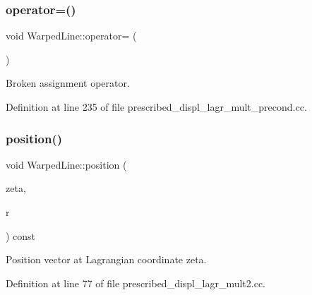 \mbox{\label{classWarpedLine_ae2ee796906c0caa7e94f277f6fc499e1}} 
\subsubsection{\texorpdfstring{operator=()}{operator=()}\hspace{0.1cm}{\footnotesize\ttfamily [3/3]}}
{\footnotesize\ttfamily void Warped\+Line\+::operator= (\begin{DoxyParamCaption}\item[{const \hyperlink{classWarpedLine}{Warped\+Line} \&}]{ }\end{DoxyParamCaption})\hspace{0.3cm}{\ttfamily [inline]}}



Broken assignment operator. 



Definition at line 235 of file prescribed\+\_\+displ\+\_\+lagr\+\_\+mult\+\_\+precond.\+cc.

\mbox{\label{classWarpedLine_aaeef89818148ee3a305c561e91c8851d}} 
\subsubsection{\texorpdfstring{position()}{position()}\hspace{0.1cm}{\footnotesize\ttfamily [1/6]}}
{\footnotesize\ttfamily void Warped\+Line\+::position (\begin{DoxyParamCaption}\item[{const Vector$<$ double $>$ \&}]{zeta,  }\item[{Vector$<$ double $>$ \&}]{r }\end{DoxyParamCaption}) const\hspace{0.3cm}{\ttfamily [inline]}}



Position vector at Lagrangian coordinate zeta. 



Definition at line 77 of file prescribed\+\_\+displ\+\_\+lagr\+\_\+mult2.\+cc.

\mbox{\label{classWarpedLine_a415d50f6bb49bd903015b51c66e93cd2}} 
